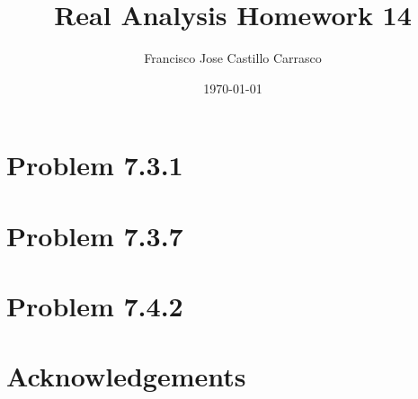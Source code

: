 




\title{Real Analysis Homework 14}
\author{Francisco Jose Castillo Carrasco}
\date{\today}
\maketitle




\section{Problem 7.3.1}


\section{Problem 7.3.7}


\section{Problem 7.4.2}


\section*{Acknowledgements}






